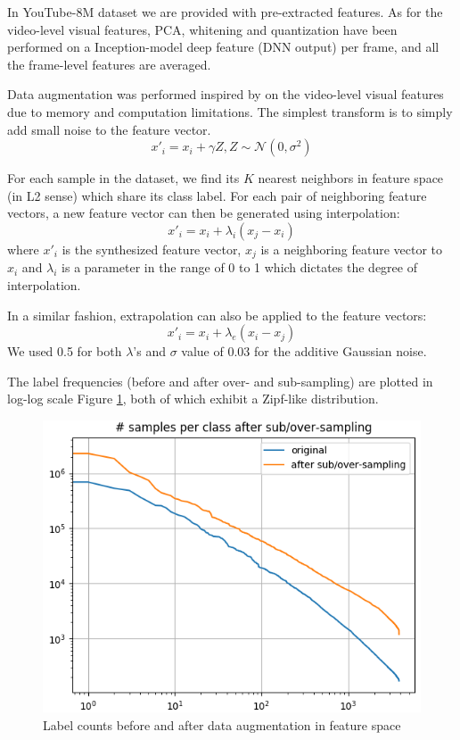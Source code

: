 \documentclass[runningheads]{llncs}
\begin{document}
In YouTube-8M dataset we are provided with pre-extracted features.
As for the video-level visual features, PCA, whitening and quantization have been performed on a Inception-model deep feature (DNN output) per frame, and all the frame-level features are averaged.

Data augmentation was performed inspired by \cite{devries2017} on the video-level visual features due to memory and computation limitations.
The simplest transform is to simply add small noise to the feature vector.
\begin{equation}
x'_i = x_i + \gamma Z, Z \sim \mathcal{N}(0, \sigma^2)
\end{equation}

For each sample in the dataset, we find its $K$ nearest neighbors in feature space (in L2 sense) which share its class label.
For each pair of neighboring feature vectors, a new feature vector can then be generated using interpolation:
\begin{equation}
x'_i = x_i + \lambda_i (x_j - x_i)
\end{equation}
where $x'_i$ is the synthesized feature vector, $x_j$ is a neighboring feature vector to $x_i$ and $\lambda_i$ is a parameter in the range of 0 to 1 which dictates the degree of interpolation.

In a similar fashion, extrapolation can also be applied to the feature vectors:
\begin{equation}
x'_i = x_i + \lambda_e (x_i - x_j)
\end{equation}
We used 0.5 for both $\lambda$'s and $\sigma$ value of 0.03 for the additive Gaussian noise.

The label frequencies (before and after over- and sub-sampling) are plotted in log-log scale Figure \ref{fig:numsamples}, both of which exhibit a Zipf-like distribution.
\begin{figure}
  \includegraphics[width=\linewidth]{./figures/new_num_samples_per_class_cropped.png}
  \caption{Label counts before and after data augmentation in feature space}
  \label{fig:numsamples}
\end{figure}
\end{document}
